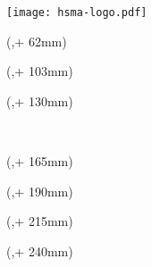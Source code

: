 \setlength{\bindekorrektur}{-46mm}   %
\setlength{\seitenanfang}{0mm}       %
\setlength{\seitenbreite}{297mm}     %

\noindent\texttt{[image: hsma-logo.pdf]}\\

\begin{textblock*}{128mm}(\hsmafenster,\seitenanfang + 62mm) %
  \centering\Large\sffamily
  \vspace{4mm} %
  \textbf{\hsmatitel}
\end{textblock*}%

\begin{textblock*}{128mm}(\hsmafenster,\seitenanfang + 103mm)
  \centering\large\sffamily
  \hsmaautor
\end{textblock*}

\begin{textblock*}{\seitenbreite}(\bindekorrektur,\seitenanfang + 130mm)
  \centering\large\sffamily
  \hsmatyp\\
  \begin{small}\hsmathesistype \end{small}\\
  \vspace{2mm}
  \hsmastudiengangname
\end{textblock*}

\begin{textblock*}{\seitenbreite}(\bindekorrektur,\seitenanfang + 165mm)
  \centering\large\sffamily
  \hsmafakultaetlang\\
  \vspace{2mm}
  \hsmakoerperschaft
\end{textblock*}

\begin{textblock*}{\seitenbreite}(\bindekorrektur,\seitenanfang + 190mm)
  \centering\large
  \textsf{\hsmadatum}
\end{textblock*}

\begin{textblock*}{\seitenbreite}(\bindekorrektur,\seitenanfang + 215mm)
  \centering\large
\end{textblock*}

\begin{textblock*}{\seitenbreite}(\bindekorrektur,\seitenanfang + 240mm)
  \centering\large\sffamily
  \hsmatutor \\
  \vspace{2mm}
  \hsmabetreuer\\
  \vspace{2mm}
  \hsmazweitkorrektor
\end{textblock*}

